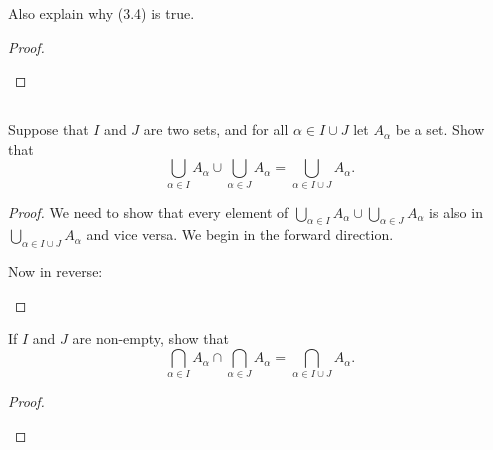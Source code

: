 \documentclass[../../main.tex]{subfiles}
\begin{document}
\begin{q}
    Also explain why (3.4) is true.
\end{q}

\begin{proof}
    
    \begin{xx}
        
    \end{xx}
\end{proof}

\subsection{}
\begin{q}
    Suppose that $I$ and $J$ are two sets, and for all $\alpha \in I \cup J$ let $A_\alpha$ be a set. Show that
    \[\bigcup_{\alpha \in I} A_\alpha \cup \bigcup_{\alpha \in J} A_\alpha = \bigcup_{\alpha \in I \cup J} A_\alpha.\]
\end{q}

    \begin{proof}
    We need to show that every element of $\bigcup_{\alpha \in I} A_\alpha \cup \bigcup_{\alpha \in J} A_\alpha$ is also in $\bigcup_{\alpha \in I \cup J} A_\alpha$ and vice versa. We begin in the forward direction.
        \begin{xx}
        \begin{lxl}
            \item
        \end{lxl}
    Now in reverse:
        \begin{lxl}
            \item
        \end{lxl}
        \end{xx}
    \end{proof}

\begin{q}
    If $I$ and $J$ are non-empty, show that
    \[\bigcap_{\alpha \in I} A_\alpha \cap \bigcap_{\alpha \in J} A_\alpha = \bigcap_{\alpha \in I \cup J} A_\alpha.\]
\end{q}


\begin{proof}
    
    \begin{xx}
    \begin{lxl}
        
    \end{lxl}
    \end{xx}
\end{proof}
\end{document}

